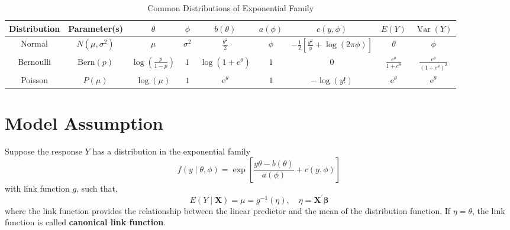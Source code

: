 \begin{landscape}
    \begin{table}[hpt]
        \centering
        \caption{Common Distributions of Exponential Family}
        \begin{tabular}{ccccccccc}
            \toprule
            Distribution & Parameter(s)      & $\theta$                         & $\phi$       & $b(\theta)$                     & $a(\phi)$ & $c(y,\phi)$                                                   & $E(Y)$                            & $\operatorname{Var}(Y)$                            \\
            \midrule
            Normal       & $N(\mu,\sigma^2)$ & $\mu$                            & $\sigma^{2}$ & $\frac{\theta^{2}}{2}$          & $\phi$    & $-\frac{1}{2}\left[\frac{y^{2}}{\phi}+\log (2\pi\phi)\right]$ & $\theta$                          & $\phi$                                             \\
            Bernoulli    & $\text{Bern}(p)$  & $\log\left(\frac{p}{1-p}\right)$ & $1$          & $\log\left(1+e^{\theta}\right)$ & $1$       & $0$                                                           & $\frac{e^{\theta}}{1+e^{\theta}}$ & $\frac{e^{\theta}}{\left(1+e^{\theta}\right)^{2}}$ \\
            Poisson      & $P(\mu)$          & $\log(\mu)$                      & $1$          & $\mathrm{e}^{\theta}$           & $1$       & $-\log(y!)$                                                   & $\mathrm{e}^{\theta}$             & $\mathrm{e}^{\theta}$                              \\
            \bottomrule
        \end{tabular}
    \end{table}
\end{landscape}

\section{Model Assumption}

Suppose the response $Y$ has a distribution in the exponential family
\begin{equation*}
    f\left(y\mid\theta,\phi\right)=\exp\left[\frac{y\theta-b(\theta)}{a(\phi)}+c(y,\phi)\right]
\end{equation*}
with link function $g$, such that,
\begin{equation}
    E\left(Y\mid\mathbf{X}\right)=\mu=g^{-1}(\eta),\quad\eta=\mathbf{X}^{\prime}\boldsymbol{\beta}
\end{equation}
where the link function provides the relationship between the linear predictor and the mean of the distribution function. If $\eta=\theta$, the link function is called \textbf{canonical link function}.

